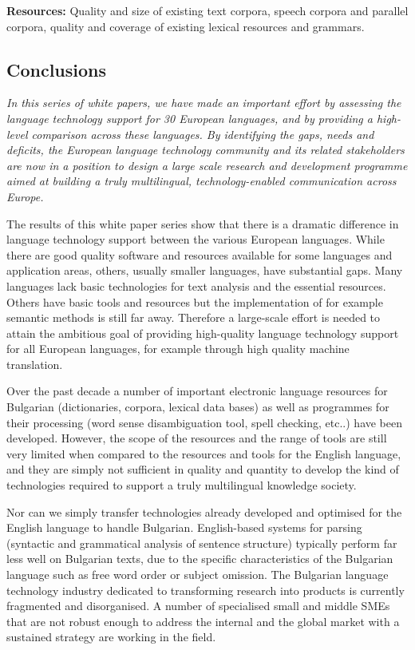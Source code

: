 \begin{multicols}{2}
  \textbf{Resources:} Quality and size of existing text corpora, speech corpora and parallel corpora, quality and coverage of existing lexical resources and grammars.

  \subsection{Conclusions}

  \emph{In this series of white papers, we have made an important effort by assessing the language technology support for 30 European languages, and by providing a high-level comparison across these languages. By identifying the gaps, needs and deficits, the European language technology community and its related stakeholders are now in a position to design a large scale research and development programme aimed at building a truly multilingual, technology-enabled communication across Europe.}

  The results of this white paper series show that there is a dramatic difference in language technology support between the various European languages. While there are good quality software and resources available for some languages and application areas, others, usually smaller languages, have substantial gaps. Many languages lack basic technologies for text analysis and the essential resources. Others have basic tools and resources but the implementation of for example semantic methods is still far away. Therefore a large-scale effort is needed to attain the ambitious goal of providing high-quality language technology support for all European languages, for example through high quality machine translation. 

  Over the past decade a number of important electronic language resources for Bulgarian (dictionaries, corpora, lexical data bases) as well as programmes for their processing (word sense disambiguation tool, spell checking, etc..) have been developed. However, the scope of the resources and the range of tools are still very limited when compared to the resources and tools for the English language, and they are simply not sufficient in quality and quantity to develop the kind of technologies required to support a truly multilingual knowledge society.
  \columnbreak

  Nor can we simply transfer technologies already developed and optimised for the English language to handle Bulgarian. English-based systems for parsing (syntactic and grammatical analysis of sentence structure) typically perform far less well on Bulgarian texts, due to the specific characteristics of the Bulgarian language such as free word order or subject omission.
  The Bulgarian language technology industry dedicated to transforming research into products is currently fragmented and disorganised. A number of specialised small and middle SMEs that are not robust enough to address the internal and the global market with a sustained strategy are working in the field.


\end{multicols}
